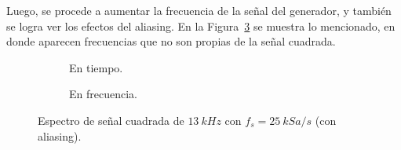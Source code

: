       Luego, se procede a aumentar la frecuencia de la señal del generador, y también se logra ver los efectos
      del aliasing. En la Figura~\ref{fig:Exp3SeñalCuadConAlias} se muestra lo mencionado, en donde aparecen
      frecuencias que no son propias de la señal cuadrada.

      \begin{figure}[H]
        \centering
        \begin{subfigure}[H]{0.41\textwidth}
          \caption{En tiempo.}
          \label{fig:Exp3AliasSeñalCuad1}
        \end{subfigure}
        \hfill 
        \begin{subfigure}[H]{0.39\textwidth}
          \caption{En frecuencia.}
          \label{fig:Exp3AliasSeñalCuad2}
        \end{subfigure}

        \caption{Espectro de señal cuadrada de $13~kHz$ con $f_s=25~kSa/s$ (con aliasing).}
        \label{fig:Exp3SeñalCuadConAlias}
      \end{figure}

